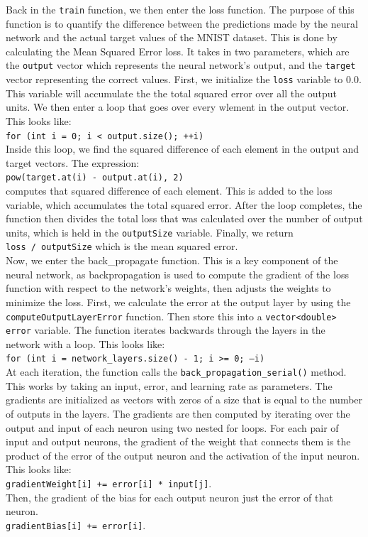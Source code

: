 \documentclass[12pt, twocolumn]{report}
\begin{document}
Back in the \texttt{train} function, we then enter the loss function. The purpose of this function is to quantify the difference between the predictions
made by the neural network and the actual target values of the MNIST dataset. This is done by calculating the Mean Squared Error loss. It takes in two parameters, which are
the \texttt{output} vector which represents the neural network's output, and the \texttt{target} vector representing the correct values. First, we initialize the \texttt{loss} variable to 0.0.
This variable will accumulate the the total squared error over all the output units. We then enter a loop that goes over every wlement in the output vector.
This looks like: \\ \texttt{for (int i = 0; i < output.size(); ++i)} \\ Inside this loop, we find the squared difference of each element in the output and target
vectors. The expression: \\ \texttt{pow(target.at(i) - output.at(i), 2)} \\ computes that squared difference of each element. This is added to the loss variable, which accumulates
the total squared error. After the loop completes, the function then divides the total loss that was calculated over the number of output units, which is held in the
\texttt{outputSize} variable. Finally, we return \\ \texttt{loss / outputSize} which is the mean squared error.
\\
Now, we enter the {back\_propagate} function. This is a key component of the neural network, as backpropagation is used to compute the gradient of the loss function
with respect to the network's weights, then adjusts the weights to minimize the loss. First, we calculate the error at the output layer by using the
\texttt{computeOutputLayerError} function. Then store this into a \texttt{vector<double> error} variable. The function iterates backwards through the layers
in the network with a loop. This looks like: \\ \texttt{for (int i = network\_layers.size() - 1; i >= 0; --i)} \\ At each iteration, the function
calls the \texttt{back\_propagation\_serial()} method. This works by taking an input, error, and learning rate as parameters. The gradients are initialized as vectors
with zeros of a size that is equal to the number of outputs in the layers. The gradients are then computed by iterating over the output and input of each neuron using two nested
for loops. For each pair of input and output neurons, the gradient of the weight that connects them is the product of the error of the output neuron and the activation of the
input neuron. This looks like: \\ \texttt{gradientWeight[i] += error[i] * input[j]}. \\ Then, the gradient of the bias for each output neuron just the error of that neuron.
\\ \texttt{gradientBias[i] += error[i]}. 
\end{document}
